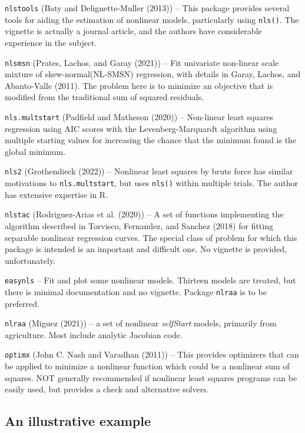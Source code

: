\texttt{nlstools} (Baty and Delignette-Muller (2013)) -- This package provides several tools for aiding the estimation
of nonlinear models, particularly using \texttt{nls()}. The vignette is actually a journal
article, and the authors have considerable experience in the subject.

\texttt{nlsmsn} (Prates, Lachos, and Garay (2021)) -- Fit univariate non-linear scale mixture of skew-normal(NL-SMSN)
regression, with details in Garay, Lachos, and Abanto-Valle (2011). The problem
here is to minimize an objective that is modified from the traditional sum of squared
residuals.

\texttt{nls.multstart} (Padfield and Matheson (2020)) -- Non-linear least squares regression using
AIC scores with the Levenberg-Marquardt algorithm using multiple starting values
for increasing the chance that the minimum found is the global minimum.

\texttt{nls2} (Grothendieck (2022)) -- Nonlinear least squares by brute force has similar
motivations to \texttt{nls.multstart}, but uses \texttt{nls()} within multiple trials. The author
has extensive expertise in R.

\texttt{nlstac} (Rodriguez-Arias et al. (2020)) -- A set of functions implementing the algorithm described in
Torvisco, Fernandez, and Sanchez (2018) for fitting separable nonlinear regression curves. The
special class of problem for which this package is intended is an important and
difficult one. No vignette is provided, unfortunately.

\texttt{easynls} -- Fit and plot some nonlinear models. Thirteen models are treated, but
there is minimal documentation and no vignette. Package \texttt{nlraa} is to be preferred.

\texttt{nlraa} (Miguez (2021)) -- a set of nonlinear \emph{selfStart} models, primarily from
agriculture. Most include analytic Jacobian code.

\texttt{optimx} (John C. Nash and Varadhan (2011)) -- This provides
optimizers that can be applied to minimize a nonlinear function which could be
a nonlinear sum of
squares. NOT generally recommended if nonlinear
least squares programs can be easily used, but provides a check and alternative
solvers.

\hypertarget{an-illustrative-example}{%
\subsection{An illustrative example}\label{an-illustrative-example}}

